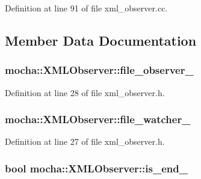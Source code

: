 Definition at line 91 of file xml\_\-observer.cc.



\subsection{Member Data Documentation}
\hypertarget{classmocha_1_1_x_m_l_observer_abfb2e76e4b3b72607e0ec46190f31f8b}{
\subsubsection[{file\_\-observer\_\-}]{ {\bf mocha::XMLObserver::file\_\-observer\_\-}}}
\label{classmocha_1_1_x_m_l_observer_abfb2e76e4b3b72607e0ec46190f31f8b}


Definition at line 28 of file xml\_\-observer.h.

\hypertarget{classmocha_1_1_x_m_l_observer_a6ba48cd14f007f841d2fe81af61f1e66}{
\subsubsection[{file\_\-watcher\_\-}]{ {\bf mocha::XMLObserver::file\_\-watcher\_\-}}}
\label{classmocha_1_1_x_m_l_observer_a6ba48cd14f007f841d2fe81af61f1e66}


Definition at line 27 of file xml\_\-observer.h.

\hypertarget{classmocha_1_1_x_m_l_observer_ae71b746017c549da13957f097ed60324}{
\subsubsection[{is\_\-end\_\-}]{\setlength{\rightskip}{0pt plus 5cm}bool {\bf mocha::XMLObserver::is\_\-end\_\-}}}
\label{classmocha_1_1_x_m_l_observer_ae71b746017c549da13957f097ed60324}


